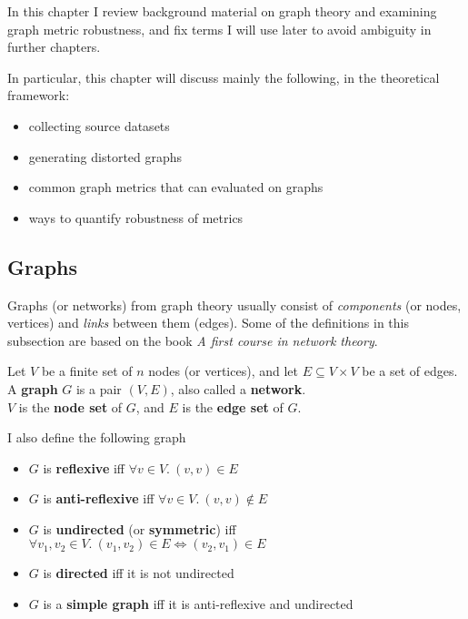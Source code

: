 In this chapter I review background material on graph theory and examining graph metric robustness, and fix terms I will use later to avoid ambiguity in further chapters.

In particular, this chapter will discuss mainly the following, in the theoretical framework:
\begin{itemize}
    \item collecting source datasets
    \item generating distorted graphs
    \item common graph metrics that can evaluated on graphs
    \item ways to quantify robustness of metrics
\end{itemize}

\subsection{Graphs}

Graphs (or networks) from graph theory usually consist of \textit{components} (or nodes, vertices) and \textit{links} between them (edges).
Some of the definitions in this subsection are based on the book \textsl{A first course in network theory}\cite{Estrada2017}.

\begin{definition}[Graph]
    Let $V$ be a finite set of $n$ nodes (or vertices), and let $E \subseteq V \times V$ be a set of edges.\\
    A \textbf{graph} $G$ is a pair $(V, E)$, also called a \textbf{network}.\\
    $V$ is the \textbf{node set} of $G$, and $E$ is the \textbf{edge set} of $G$.
\end{definition}

\noindent
I also define the following graph

\begin{definition}
    \begin{itemize}[leftmargin=*]
        \item $G$ is \textbf{reflexive} iff $\forall v \in V.\ (v, v) \in E$
        \item $G$ is \textbf{anti-reflexive} iff $\forall v \in V.\ (v, v) \notin E$
        \item $G$ is \textbf{undirected} (or \textbf{symmetric}) iff $\forall v_1, v_2 \in V.\ (v_1, v_2) \in E \Leftrightarrow (v_2, v_1) \in E$
        \item $G$ is \textbf{directed} iff it is not undirected
        \item $G$ is a \textbf{simple graph} iff it is anti-reflexive and undirected
    \end{itemize}
\end{definition}


